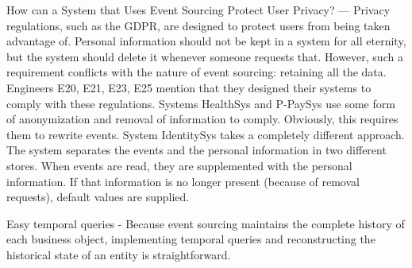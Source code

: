 How can a System that Uses Event Sourcing Protect User Privacy? — Privacy regulations, such as the GDPR, are designed to protect users from being taken advantage of. Personal information should not be kept in a system for all eternity, but the system should delete it whenever someone requests that. However, such a requirement conflicts with the nature of event sourcing: retaining all the data. Engineers E20, E21, E23, E25 mention that they designed their systems to comply with these regulations. Systems HealthSys and P-PaySys use some form of anonymization and removal of information to comply. Obviously, this requires them to rewrite events. System IdentitySys takes a completely different approach. The system separates the events and the personal information in two different stores. When events are read, they are supplemented with the personal information. If that information is no longer present (because of removal requests), default values are supplied.

Easy temporal queries - Because event sourcing maintains the complete history of each business object, implementing temporal queries and reconstructing the historical state of an entity is straightforward. %




